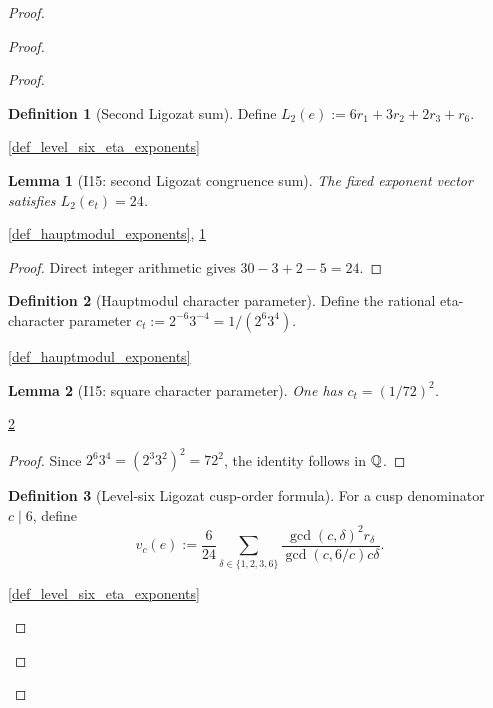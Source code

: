 \documentclass[11pt,a4paper]{article}
\numberwithin{equation}{section}
\theoremstyle{plain}\newtheorem{theorem}{Theorem}[section]\newaliascnt{proposition}{theorem}\newtheorem{proposition}[proposition]{Proposition}\aliascntresetthe{proposition}\newaliascnt{lemma}{theorem}\newtheorem{lemma}[lemma]{Lemma}\aliascntresetthe{lemma}
\theoremstyle{definition}\newaliascnt{definition}{theorem}\newtheorem{definition}[definition]{Definition}\aliascntresetthe{definition}\newaliascnt{notation}{theorem}\newtheorem{notation}[notation]{Notation}\aliascntresetthe{notation}
\providecommand{\lean}[1]{}\providecommand{\leanok}{}
\begin{document}
\begin{proof}
\begin{proof}
\begin{proof}
\begin{definition}[Second Ligozat sum]\label{def_second_ligozat_sum}\lean{SptCM.CM.Repaired.secondLigozatSum}\leanok
Define $L_2(e):=6r_1+3r_2+2r_3+r_6$.
\end{definition}
\begin{uses-statement}\ref{def_level_six_eta_exponents}\end{uses-statement}

\begin{lemma}[I15: second Ligozat congruence sum]\label{lem_i15_second_ligozat_sum}\lean{SptCM.CM.Repaired.hauptmodul_second_ligozat_sum}\leanok
The fixed exponent vector satisfies $L_2(e_t)=24$.
\end{lemma}
\begin{uses-statement}\ref{def_hauptmodul_exponents}, \ref{def_second_ligozat_sum}\end{uses-statement}
\begin{proof}Direct integer arithmetic gives $30-3+2-5=24$.\end{proof}

\begin{definition}[Hauptmodul character parameter]\label{def_hauptmodul_character_parameter}\lean{SptCM.CM.Repaired.hauptmodulCharacterParameter}\leanok
Define the rational eta-character parameter $c_t:=2^{-6}3^{-4}=1/(2^6 3^4)$.
\end{definition}
\begin{uses-statement}\ref{def_hauptmodul_exponents}\end{uses-statement}

\begin{lemma}[I15: square character parameter]\label{lem_i15_character_square}\lean{SptCM.CM.Repaired.hauptmodul_character_parameter_isSquare}\leanok
One has $c_t=(1/72)^2$.
\end{lemma}
\begin{uses-statement}\ref{def_hauptmodul_character_parameter}\end{uses-statement}
\begin{proof}Since $2^6 3^4=(2^3 3^2)^2=72^2$, the identity follows in $\mathbb Q$.\end{proof}

\begin{definition}[Level-six Ligozat cusp-order formula]\label{def_ligozat_cusp_order}\lean{SptCM.CM.Repaired.ligozatCuspOrder}\leanok
For a cusp denominator $c\mid6$, define
\[
 v_c(e):=\frac6{24}\sum_{\delta\in\{1,2,3,6\}}
 \frac{\gcd(c,\delta)^2r_\delta}{\gcd(c,6/c)c\delta}.
\]
\end{definition}
\begin{uses-statement}\ref{def_level_six_eta_exponents}\end{uses-statement}


\end{proof}
\end{proof}
\end{proof}
\end{document}

